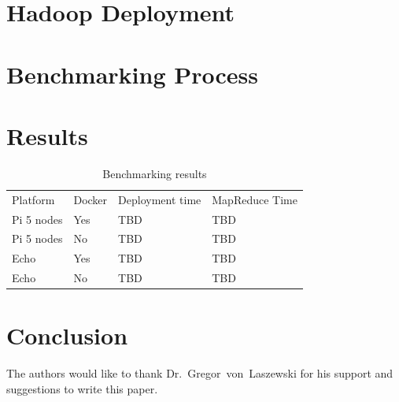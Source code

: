 \section{Hadoop Deployment}
\label{s:hadoopdep}


\section{Benchmarking Process}


\section{Results}

\begin{table}[hbt]
\centering
\caption{Benchmarking results}\label{t:results-table}
\begin{tabular}{llll}
Platform    & Docker & Deployment time & MapReduce Time \\
Pi 5 nodes  & Yes    & TBD             & TBD            \\
Pi 5 nodes  & No     & TBD             & TBD            \\
Echo        & Yes    & TBD             & TBD            \\
Echo        & No     & TBD             & TBD            \\
\end{tabular}
\end{table}



\section{Conclusion}



\begin{acks}

  The authors would like to thank Dr.~Gregor~von~Laszewski for his
  support and suggestions to write this paper.

\end{acks}



